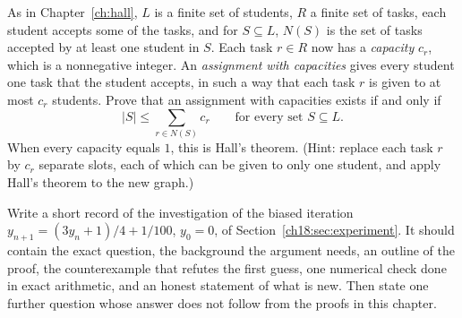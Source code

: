 \begin{exercise}\label{ex:18.5}As in Chapter~\ref{ch:hall}, $L$ is a finite set of students, $R$ a finite set of tasks, each student accepts some of the tasks, and for $S\subseteq L$, $N(S)$ is the set of tasks accepted by at least one student in $S$. Each task $r\in R$ now has a \emph{capacity} $c_r$, which is a nonnegative integer. An \emph{assignment with capacities} gives every student one task that the student accepts, in such a way that each task $r$ is given to at most $c_r$ students. Prove that an assignment with capacities exists if and only if
\[
 |S|\le\sum_{r\in N(S)}c_r\qquad\text{for every set }S\subseteq L.
\]
When every capacity equals $1$, this is Hall's theorem. (Hint: replace each task $r$ by $c_r$ separate slots, each of which can be given to only one student, and apply Hall's theorem to the new graph.)\end{exercise}
\begin{exercise}\label{ex:18.6}Write a short record of the investigation of the biased iteration $y_{n+1}=(3y_n+1)/4+1/100$, $y_0=0$, of Section~\ref{ch18:sec:experiment}. It should contain the exact question, the background the argument needs, an outline of the proof, the counterexample that refutes the first guess, one numerical check done in exact arithmetic, and an honest statement of what is new. Then state one further question whose answer does not follow from the proofs in this chapter.\end{exercise}
